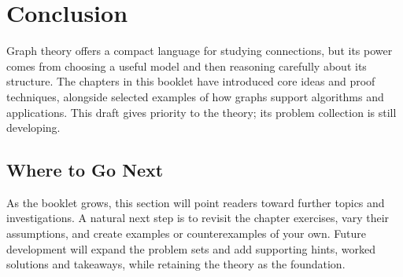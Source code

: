 \chapter*{Conclusion}
Graph theory offers a compact language for studying connections, but its power comes from choosing a useful model and then reasoning carefully about its structure. The chapters in this booklet have introduced core ideas and proof techniques, alongside selected examples of how graphs support algorithms and applications. This draft gives priority to the theory; its problem collection is still developing.

\section*{Where to Go Next}
As the booklet grows, this section will point readers toward further topics and investigations. A natural next step is to revisit the chapter exercises, vary their assumptions, and create examples or counterexamples of your own. Future development will expand the problem sets and add supporting hints, worked solutions and takeaways, while retaining the theory as the foundation.
